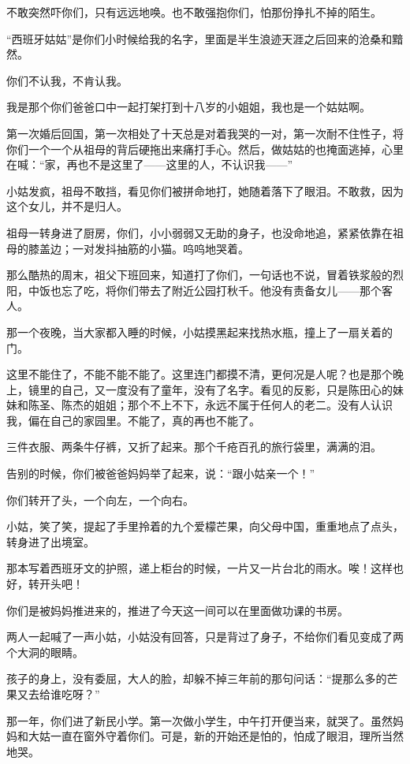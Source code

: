 \par 不敢突然吓你们，只有远远地唤。也不敢强抱你们，怕那份挣扎不掉的陌生。
\par “西班牙姑姑”是你们小时候给我的名字，里面是半生浪迹天涯之后回来的沧桑和黯然。
\par 你们不认我，不肯认我。
\par 我是那个你们爸爸口中一起打架打到十八岁的小姐姐，我也是一个姑姑啊。
\par 第一次婚后回国，第一次相处了十天总是对着我哭的一对，第一次耐不住性子，将你们一个一个从祖母的背后硬拖出来痛打手心。然后，做姑姑的也掩面逃掉，心里在喊：“家，再也不是这里了——这里的人，不认识我——”
\par 小姑发疯，祖母不敢挡，看见你们被拼命地打，她随着落下了眼泪。不敢救，因为这个女儿，并不是归人。
\par 祖母一转身进了厨房，你们，小小弱弱又无助的身子，也没命地追，紧紧依靠在祖母的膝盖边；一对发抖抽筋的小猫。呜呜地哭着。
\par 那么酷热的周末，祖父下班回来，知道打了你们，一句话也不说，冒着铁浆般的烈阳，中饭也忘了吃，将你们带去了附近公园打秋千。他没有责备女儿——那个客人。
\par 那一个夜晚，当大家都入睡的时候，小姑摸黑起来找热水瓶，撞上了一扇关着的门。
\par 这里不能住了，不能不能不能了。这里连门都摸不清，更何况是人呢？也是那个晚上，镜里的自己，又一度没有了童年，没有了名字。看见的反影，只是陈田心的妹妹和陈圣、陈杰的姐姐；那个不上不下，永远不属于任何人的老二。没有人认识我，偏在自己的家园里。不能了，真的再也不能了。
\par 三件衣服、两条牛仔裤，又折了起来。那个千疮百孔的旅行袋里，满满的泪。
\par 告别的时候，你们被爸爸妈妈举了起来，说：“跟小姑亲一个！”
\par 你们转开了头，一个向左，一个向右。
\par 小姑，笑了笑，提起了手里拎着的九个爱檬芒果，向父母中国，重重地点了点头，转身进了出境室。
\par 那本写着西班牙文的护照，递上柜台的时候，一片又一片台北的雨水。唉！这样也好，转开头吧！
\par 你们是被妈妈推进来的，推进了今天这一间可以在里面做功课的书房。
\par 两人一起喊了一声小姑，小姑没有回答，只是背过了身子，不给你们看见变成了两个大洞的眼睛。
\par 孩子的身上，没有委屈，大人的脸，却躲不掉三年前的那句问话：“提那么多的芒果又去给谁吃呀？”
\par 那一年，你们进了新民小学。第一次做小学生，中午打开便当来，就哭了。虽然妈妈和大姑一直在窗外守着你们。可是，新的开始还是怕的，怕成了眼泪，理所当然地哭。
